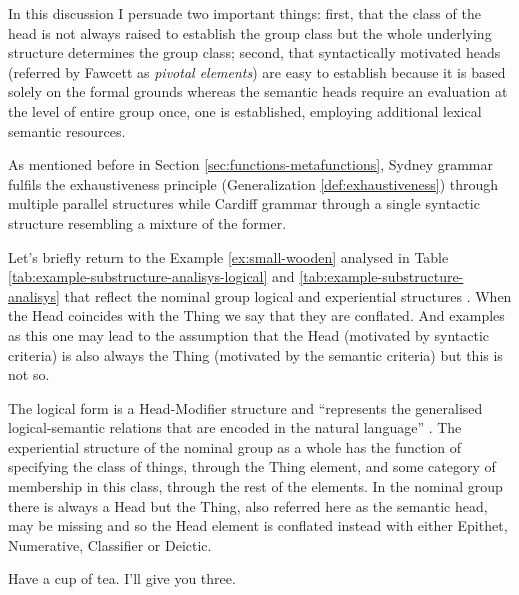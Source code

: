 In this discussion I persuade two important things: first, that the class of the head is not always raised to establish the group class but the whole underlying structure determines the group class; second, that syntactically motivated heads (referred by Fawcett as \textit{pivotal elements}) are easy to establish because it is based solely on the formal grounds whereas the semantic heads require an evaluation at the level of entire group once, one is established, employing additional lexical semantic resources.

As mentioned before in Section \ref{sec:functions-metafunctions}, Sydney grammar fulfils the exhaustiveness principle (Generalization \ref{def:exhaustiveness}) through multiple parallel structures while Cardiff grammar through a single syntactic structure resembling a mixture of the former. 

Let's briefly return to the Example \ref{ex:small-wooden} analysed in Table \ref{tab:example-substructure-analisys-logical} and \ref{tab:example-substructure-analisys} that reflect the nominal group logical and experiential structures \citet[391]{Halliday2013}. When the Head coincides with the Thing we say that they are conflated. And examples as this one may lead to the assumption that the Head (motivated by syntactic criteria) is also always the Thing (motivated by the semantic criteria) but this is not so.

The logical form is a Head-Modifier structure and ``represents the generalised logical-semantic relations that are encoded in the natural language'' \citep[388]{Halliday2013}. The experiential structure of the nominal group as a whole has the function of specifying the class of things, through the Thing element, and some category of membership in this class, through the rest of the elements. In the nominal group there is always a Head but the Thing, also referred here as the semantic head, may be missing and so the Head element is conflated instead with either Epithet, Numerative, Classifier or Deictic.

\begin{exe}
	\ex\label{ex:one} Have a cup of tea. 
	\ex\label{ex:three} I'll give you three.
\end{exe}


%
%

